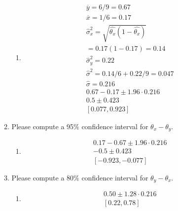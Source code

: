\documentclass[krantz1,ChapterTOCs]{krantz}
\begin{document}
\begin{enumerate}
\begin{enumerate}
        \begin{enumerate}
            \item {\color{red}
                \begin{align}
                    \overline{y} = 6/9 = 0.67\\
                    \overline{x} = 1/6 = 0.17\\
                    \hat{\sigma}^{2}_{x} = \sqrt{ \hat{\theta_{x}}(1-\hat{\theta_{x}}) }\\
                    = 0.17 (1-0.17) = 0.14 \\
                    \hat{\sigma}^{2}_{y} = 0.22\\
                    \hat{\sigma}^{2} = 0.14/6 + 0.22/9 = 0.047\\
                    \hat{\sigma} = 0.216\\
                    0.67-0.17 \pm 1.96 \cdot 0.216\\
                    0.5       \pm 0.423 \\ 
                    [0.077, 0.923]
                \end{align}
            }
        \end{enumerate}

        
        \item Please compute a 95\% confidence interval for $\theta_{x} - \theta_{y}$.
        \begin{enumerate}
            \item {\color{red}
            \begin{align}
                0.17 - 0.67 \pm 1.96 \cdot 0.216\\
                -0.5       \pm 0.423 \\ 
                [-0.923, -0.077]
            \end{align}
            
            }
        \end{enumerate}

        
        \item Please compute a 80\% confidence interval for $\theta_{y} - \theta_{x}$.
        \begin{enumerate}
            \item {\color{red}
            
            \begin{align}
                0.50 \pm 1.28 \cdot 0.216\\
                [0.22, 0.78]
            \end{align}
            
}
\end{enumerate}
\end{enumerate}
\end{enumerate}
\end{document}
